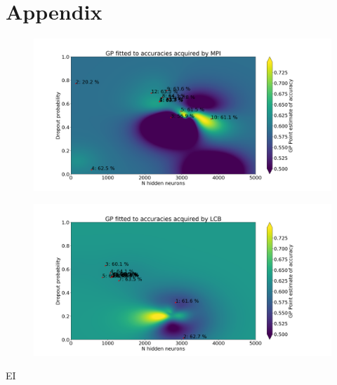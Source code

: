 \documentclass[12pt,fleqn]{article}
\begin{document}
\section{Appendix}
\begin{figure}[H]

		\includegraphics[width=\textwidth]{MPIGP}	
\end{figure}
\begin{figure}[H]
		\includegraphics[width=\textwidth]{LCBGP}	

\end{figure}
EI
\end{document}
